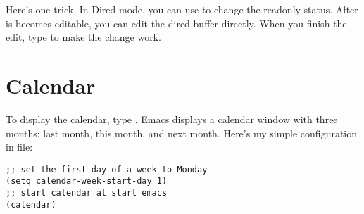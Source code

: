 Here's one trick.
In Dired mode, you can use  to change the readonly status.
After is becomes editable, you can edit the dired buffer directly.
When you finish the edit, type  to make the change work.

\section{Calendar}
\label{sec:calendar}

To display the calendar, type .
Emacs displays a calendar window with three months: last month, this month, and next month.
Here's my simple configuration in  file:
\begin{lstlisting}
;; set the first day of a week to Monday
(setq calendar-week-start-day 1)
;; start calendar at start emacs
(calendar)
\end{lstlisting}

\newpage{}

